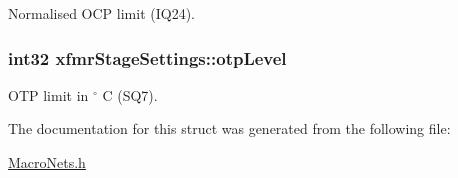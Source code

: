 Normalised O\-C\-P limit (I\-Q24). \hypertarget{a00010_a582f0218997b0b37f365b75ae274e67c}{
\subsubsection[{otp\-Level}]{\setlength{\rightskip}{0pt plus 5cm}int32 xfmr\-Stage\-Settings\-::otp\-Level}}\label{a00010_a582f0218997b0b37f365b75ae274e67c}
O\-T\-P limit in $ ^\circ$ C (S\-Q7). 

The documentation for this struct was generated from the following file\-:\begin{DoxyCompactItemize}
\item 
\hyperlink{a00027}{Macro\-Nets.\-h}\end{DoxyCompactItemize}
